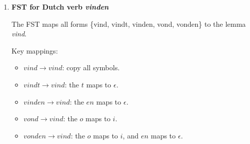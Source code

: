 \documentclass[11pt]{article}
\begin{document}
\begin{enumerate}
\begin{enumerate}
Regular expression:

$$0(10)^*1(0 \mid \epsilon)$$

Verification: $01$ \checkmark, $010$ \checkmark, $0101$ \checkmark, $01010$ \checkmark.

\item Subset construction:

Start state: $\{q_0\}$. Accepting states contain $q_3$.

\begin{itemize}
\item $\{q_0\}$: input $0 \to \{q_1\}$; input $1 \to \emptyset$
\item $\{q_1\}$: input $0 \to \emptyset$; input $1 \to \{q_2, q_3\}$
\item $\{q_2, q_3\}$: input $0 \to \{q_1, q_3\}$ (from $q_2$); input $1 \to \emptyset$
\item $\{q_1, q_3\}$: input $0 \to \emptyset$; input $1 \to \{q_2, q_3\}$
\end{itemize}

Let $A = \{q_0\}$, $B = \{q_1\}$, $C = \{q_2, q_3\}$, $D = \{q_1, q_3\}$. Accepting: $C, D$.

\begin{center}
\end{center}

\end{enumerate}

\item \textbf{FST for Dutch verb \emph{vinden}}

The FST maps all forms \{vind, vindt, vinden, vond, vonden\} to the lemma \emph{vind}.

Key mappings:
\begin{itemize}
\item $vind \to vind$: copy all symbols.
\item $vindt \to vind$: the $t$ maps to $\epsilon$.
\item $vinden \to vind$: the $en$ maps to $\epsilon$.
\item $vond \to vind$: the $o$ maps to $i$.
\item $vonden \to vind$: the $o$ maps to $i$, and $en$ maps to $\epsilon$.
\end{itemize}


\end{enumerate}
\end{document}

